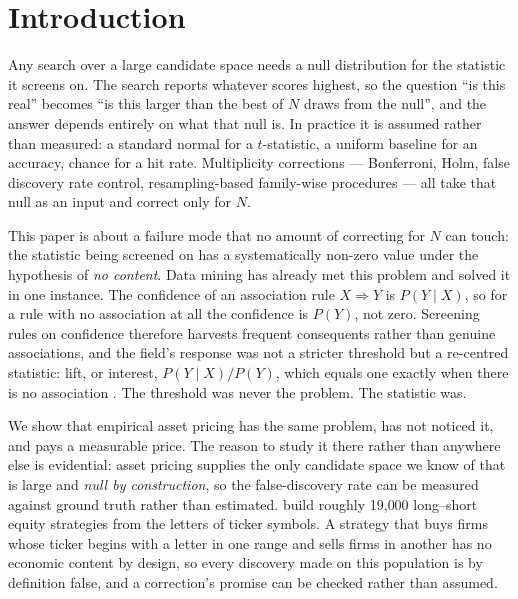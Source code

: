 \documentclass{article}
\begin{document}
\section{Introduction}
\label{sec:intro}

Any search over a large candidate space needs a null distribution for the
statistic it screens on. The search reports whatever scores highest, so the
question ``is this real'' becomes ``is this larger than the best of $N$ draws
from the null'', and the answer depends entirely on what that null is. In
practice it is assumed rather than measured: a standard normal for a
$t$-statistic, a uniform baseline for an accuracy, chance for a hit rate.
Multiplicity corrections --- Bonferroni, Holm, false discovery rate control,
resampling-based family-wise procedures --- all take that null as an input and
correct only for $N$.

This paper is about a failure mode that no amount of correcting for $N$ can
touch: the statistic being screened on has a systematically non-zero value
under the hypothesis of \emph{no content}. Data mining has already met this
problem and solved it in one instance. The confidence of an association rule
$X \Rightarrow Y$ is $P(Y \mid X)$, so for a rule with no association at all the
confidence is $P(Y)$, not zero. Screening rules on confidence therefore
harvests frequent consequents rather than genuine associations, and the field's
response was not a stricter threshold but a re-centred statistic: lift, or
interest, $P(Y \mid X)/P(Y)$, which equals one exactly when there is no
association \citep{brin1997}. The threshold was never the problem. The
statistic was.

We show that empirical asset pricing has the same problem, has not noticed it,
and pays a measurable price. The reason to study it there rather than anywhere
else is evidential: asset pricing supplies the only candidate space we know of
that is large and \emph{null by construction}, so the false-discovery rate can
be measured against ground truth rather than estimated.
\citet{chen2025htap} build roughly 19{,}000 long--short equity strategies from
the letters of ticker symbols. A strategy that buys firms whose ticker begins
with a letter in one range and sells firms in another has no economic content
by design, so every discovery made on this population is by definition false,
and a correction's promise can be checked rather than assumed.
\end{document}
